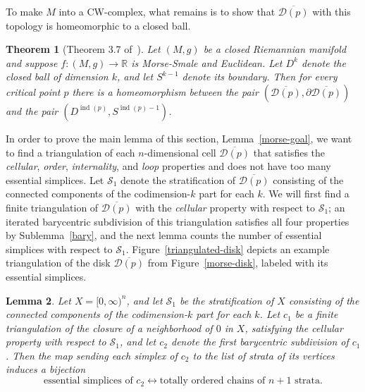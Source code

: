 \documentclass[psamsfonts]{amsart}
\newtheorem{theorem}{Theorem}
\newtheorem{lemma}[theorem]{Lemma}
\theoremstyle{remark}
\newcommand{\del}{\partial}
\DeclareMathOperator{\ind}{ind}
\begin{document}
To make $M$ into a CW-complex, what remains is to show that $\overline{\mathcal{D}(p)}$ with this topology is homeomorphic to a closed ball.

\begin{theorem}[Theorem 3.7 of~\cite{Qin10}]\label{ball}
Let $(M, g)$ be a closed Riemannian manifold and suppose $f : (M, g) \rightarrow \mathbb{R}$ is Morse-Smale and Euclidean.  Let $D^k$ denote the closed ball of dimension $k$, and let $S^{k-1}$ denote its boundary.  Then for every critical point $p$ there is a homeomorphism between the pair $(\overline{\mathcal{D}(p)}, \del \overline{\mathcal{D}(p)})$ and the pair $(D^{\ind(p)}, S^{\ind(p) - 1})$.
\end{theorem}

In order to prove the main lemma of this section, Lemma~\ref{morse-goal}, we want to find a triangulation of each $n$-dimensional cell $\overline{\mathcal{D}(p)}$ that satisfies the \emph{cellular}, \emph{order}, \emph{internality}, and \emph{loop} properties and does not have too many essential simplices.  Let $\mathcal{S}_1$ denote the stratification of $\overline{\mathcal{D}(p)}$ consisting of the connected components of the codimension-$k$ part for each $k$.  We will first find a finite triangulation of $\overline{\mathcal{D}(p)}$ with the \emph{cellular} property with respect to $\mathcal{S}_1$; an iterated barycentric subdivision of this triangulation satisfies all four properties by Sublemma~\ref{bary}, and the next lemma counts the number of essential simplices with respect to $\mathcal{S}_1$.  Figure~\ref{triangulated-disk} depicts an example triangulation of the disk $\overline{\mathcal{D}(p)}$ from Figure~\ref{morse-disk}, labeled with its essential simplices.

\begin{lemma}\label{corner}
Let $X = [0, \infty)^n$, and let $\mathcal{S}_1$ be the stratification of $X$ consisting of the connected components of the codimension-$k$ part for each $k$.  Let $c_1$ be a finite triangulation of the closure of a neighborhood of $0$ in $X$, satisfying the \emph{cellular} property with respect to $\mathcal{S}_1$, and let $c_2$ denote the first barycentric subdivision of $c_1$.  Then the map sending each simplex of $c_2$ to the list of strata of its vertices induces a bijection
\[\text{essential simplices of }c_2 \leftrightarrow \text{totally ordered chains of }n+1\text{ strata}.\]
\end{lemma}
\end{document}
